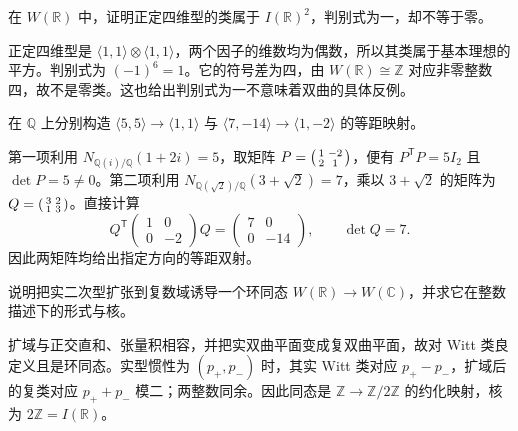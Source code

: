 \begin{exercise}\label{b2:ex:B-discriminant-insufficient}
	在 \(W(\mathbb R)\) 中，证明正定四维型的类属于 \(I(\mathbb R)^2\)，判别式为一，却不等于零。
\end{exercise}
\begin{solution}
	正定四维型是 \(\langle1,1\rangle\otimes\langle1,1\rangle\)，两个因子的维数均为偶数，所以其类属于基本理想的平方。判别式为 \((-1)^6=1\)。它的符号差为四，由 \(W(\mathbb R)\cong\mathbb Z\) 对应非零整数四，故不是零类。这也给出判别式为一不意味着双曲的具体反例。
\end{solution}

\begin{exercise}\label{b2:ex:B-binary-norm-isometries}
	在 \(\mathbb Q\) 上分别构造 \(\langle5,5\rangle\to\langle1,1\rangle\) 与 \(\langle7,-14\rangle\to\langle1,-2\rangle\) 的等距映射。
\end{exercise}
\begin{solution}
	第一项利用 \(N_{\mathbb Q(i)/\mathbb Q}(1+2i)=5\)，取矩阵 \(P=\begin{psmallmatrix}1&-2\\2&1\end{psmallmatrix}\)，便有 \(P^{\mathsf T}P=5I_2\) 且 \(\det P=5\ne0\)。第二项利用 \(N_{\mathbb Q(\sqrt2)/\mathbb Q}(3+\sqrt2)=7\)，乘以 \(3+\sqrt2\) 的矩阵为 \(Q=\begin{psmallmatrix}3&2\\1&3\end{psmallmatrix}\)。直接计算
	\[
		Q^{\mathsf T}\begin{pmatrix}1&0\\0&-2\end{pmatrix}Q
		=\begin{pmatrix}7&0\\0&-14\end{pmatrix},\qquad \det Q=7.
	\]
	因此两矩阵均给出指定方向的等距双射。
\end{solution}

\begin{exercise}\label{b2:ex:B-witt-extension}
	说明把实二次型扩张到复数域诱导一个环同态 \(W(\mathbb R)\to W(\mathbb C)\)，并求它在整数描述下的形式与核。
\end{exercise}
\begin{solution}
	扩域与正交直和、张量积相容，并把实双曲平面变成复双曲平面，故对 Witt 类良定义且是环同态。实型惯性为 \((p_+,p_-)\) 时，其实 Witt 类对应 \(p_+-p_-\)，扩域后的复类对应 \(p_++p_-\) 模二；两整数同余。因此同态是 \(\mathbb Z\to\mathbb Z/2\mathbb Z\) 的约化映射，核为 \(2\mathbb Z=I(\mathbb R)\)。
\end{solution}

